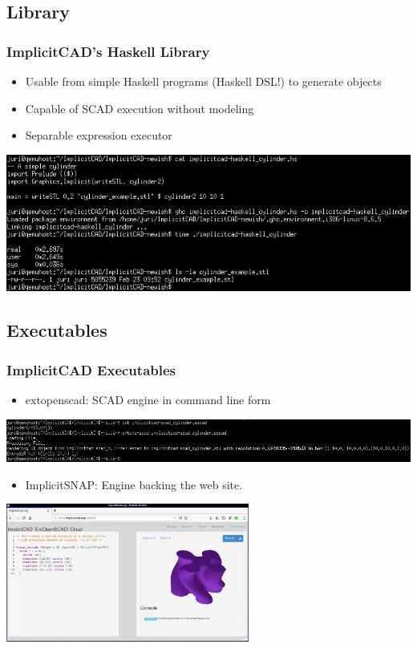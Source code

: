 \documentclass{beamer}
\begin{document}
\subsection{Library}
\begin{frame}
\frametitle{ImplicitCAD's Haskell Library}
\begin{itemize}
\item Usable from simple Haskell programs (Haskell DSL!) to generate objects
\item Capable of SCAD execution without modeling
\item Separable expression executor
\end{itemize}
\includegraphics[width=1.0\textwidth, center]{haskell_cylinder_example.png}
\end{frame}

\subsection{Executables}
\begin{frame}
\frametitle{ImplicitCAD Executables}
\begin{itemize}
\item extopenscad: SCAD engine in command line form
\end{itemize}
\includegraphics[width=1.0\textwidth, left]{extopenscad_example_003.png}
\begin{itemize}
\item ImplicitSNAP: Engine backing the web site.
\end{itemize}
\includegraphics[width=0.6\textwidth, center]{website-frame_grab.png}
\end{frame}
\end{document}
